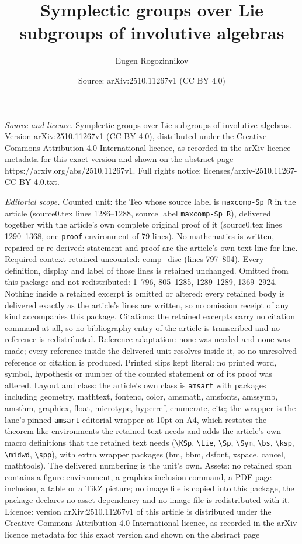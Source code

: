 \documentclass[10pt,a4paper]{amsart}
\title[Symplectic groups over Lie subgroups of involutive algebras]{Symplectic groups over Lie subgroups of involutive algebras}
\author{Eugen Rogozinnikov}
\date{Source: arXiv:2510.11267v1 (CC BY 4.0)}
\begin{document}
\maketitle

\noindent\emph{Source and licence.} Symplectic groups over Lie subgroups of involutive algebras. Version arXiv:2510.11267v1 (CC BY 4.0), distributed under the Creative Commons Attribution 4.0 International licence, as recorded in the arXiv licence metadata for this exact version and shown on the abstract page https://arxiv.org/abs/2510.11267v1. Full rights notice: licenses/arxiv-2510.11267-CC-BY-4.0.txt.\par\smallskip

\noindent\textit{Editorial scope.} Counted unit: the Teo whose source label is \texttt{maxcomp-Sp\_R} in the article (source0.tex lines 1286--1288, source label \texttt{maxcomp-Sp\_R}), delivered together with the article's own complete original proof of it (source0.tex lines 1290--1368, one \texttt{proof} environment of 79 lines). No mathematics is written, repaired or re-derived: statement and proof are the article's own text line for line. Required context retained uncounted: comp\_disc (lines 797--804). Every definition, display and label of those lines is retained unchanged. Omitted from this package and not redistributed: 1--796, 805--1285, 1289--1289, 1369--2924. Nothing inside a retained excerpt is omitted or altered: every retained body is delivered exactly as the article's lines are written, so no omission receipt of any kind accompanies this package. Citations: the retained excerpts carry no citation command at all, so no bibliography entry of the article is transcribed and no reference is redistributed. Reference adaptation: none was needed and none was made; every reference inside the delivered unit resolves inside it, so no unresolved reference or citation is produced. Printed slips kept literal: no printed word, symbol, hypothesis or number of the counted statement or of its proof was altered. Layout and class: the article's own class is \texttt{amsart} with packages including geometry, mathtext, fontenc, color, amsmath, amsfonts, amssymb, amsthm, graphicx, float, microtype, hyperref, enumerate, cite; the wrapper is the lane's pinned \texttt{amsart} editorial wrapper at 10pt on A4, which restates the theorem-like environments the retained text needs and adds the article's own macro definitions that the retained text needs (\texttt{\textbackslash KSp}, \texttt{\textbackslash Lie}, \texttt{\textbackslash Sp}, \texttt{\textbackslash Sym}, \texttt{\textbackslash bs}, \texttt{\textbackslash ksp}, \texttt{\textbackslash midwd}, \texttt{\textbackslash spp}), with extra wrapper packages (bm, bbm, dsfont, xspace, cancel, mathtools). The delivered numbering is the unit's own. Assets: no retained span contains a figure environment, a graphics-inclusion command, a PDF-page inclusion, a table or a TikZ picture; no image file is copied into this package, the package declares no asset dependency and no image file is redistributed with it. Licence: version arXiv:2510.11267v1 of this article is distributed under the Creative Commons Attribution 4.0 International licence, as recorded in the arXiv licence metadata for this exact version and shown on the abstract page 
\end{document}
